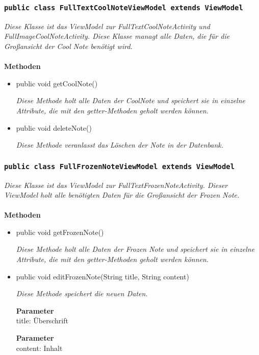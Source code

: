            		\subsubsection{\texttt{public class FullTextCoolNoteViewModel extends ViewModel}}
        \textit{Diese Klasse ist das ViewModel zur FullTextCoolNoteActivity und FullImageCoolNoteActivity. Diese Klasse managt alle Daten, die für die Großansicht der Cool Note benötigt wird.}\\
        \\
		\textbf{Methoden} \\
 			\begin{itemize}
        		\item{public void getCoolNote()}
        	
        		\textit{Diese Methode holt alle Daten der CoolNote und speichert sie in einzelne Attribute, die mit den getter-Methoden geholt werden können.}
        		
        		\item{public void deleteNote()}
        	
        		\textit{Diese Methode veranlasst das Löschen der Note in der Datenbank.}

       		 \end{itemize}
             
             
                 \subsubsection{\texttt{public class FullFrozenNoteViewModel extends ViewModel}}
        \textit{Diese Klasse ist das ViewModel zur FullTextFrozenNoteActivity. Dieser ViewModel holt alle benötigten Daten für die Großansicht der Frozen Note.}\\
        \\
		\textbf{Methoden} \\
 			\begin{itemize}
        		\item{public void getFrozenNote()}
        	
        		\textit{Diese Methode holt alle Daten der Frozen Note und speichert sie in einzelne Attribute, die mit den getter-Methoden geholt werden können.}
        	
        		\item{public void editFrozenNote(String title, String content)}
        	
        		\textit{Diese Methode speichert die neuen Daten.}
        	
        	\textbf{Parameter} \\
				title: Überschrift
				
			\textbf{Parameter} \\
			content: Inhalt
				
       		 \end{itemize}
       		 
